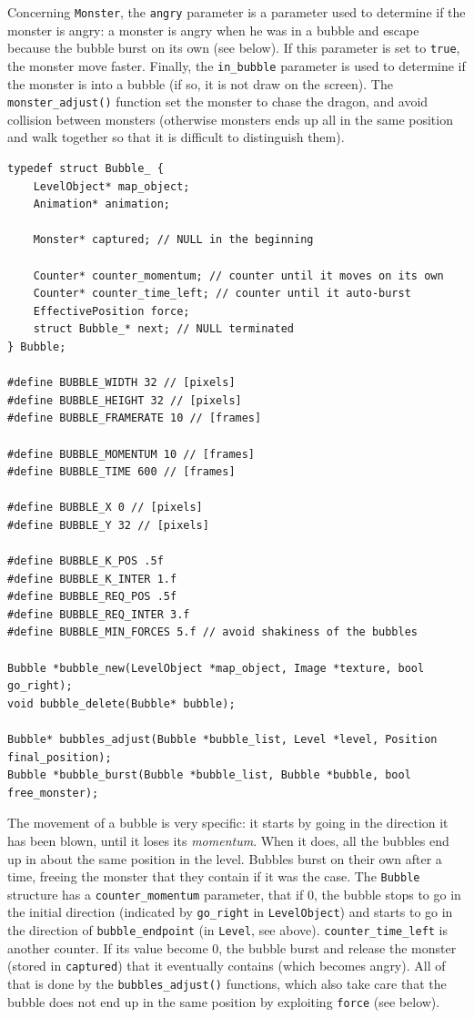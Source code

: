 \documentclass[12pt,a4paper]{article}
\newcommand{\cc}[1]{\texttt{#1}}
\begin{document}
Concerning \cc{Monster}, the \cc{angry} parameter is a parameter used to determine if the monster is angry: a monster is angry when he was in a bubble and escape because the bubble burst on its own (see below). If this parameter is set to \cc{true}, the monster move faster. Finally, the \cc{in_bubble} parameter is used to determine if the monster is into a bubble (if so, it is not draw on the screen). The \cc{monster_adjust()} function set the monster to chase the dragon, and avoid collision between monsters (otherwise monsters ends up all in the same position and walk together so that it is difficult to distinguish them).

\begin{verbatim}
typedef struct Bubble_ {
    LevelObject* map_object;
    Animation* animation;

    Monster* captured; // NULL in the beginning

    Counter* counter_momentum; // counter until it moves on its own
    Counter* counter_time_left; // counter until it auto-burst
    EffectivePosition force;
    struct Bubble_* next; // NULL terminated
} Bubble;

#define BUBBLE_WIDTH 32 // [pixels]
#define BUBBLE_HEIGHT 32 // [pixels]
#define BUBBLE_FRAMERATE 10 // [frames]

#define BUBBLE_MOMENTUM 10 // [frames]
#define BUBBLE_TIME 600 // [frames]

#define BUBBLE_X 0 // [pixels]
#define BUBBLE_Y 32 // [pixels]

#define BUBBLE_K_POS .5f
#define BUBBLE_K_INTER 1.f
#define BUBBLE_REQ_POS .5f
#define BUBBLE_REQ_INTER 3.f
#define BUBBLE_MIN_FORCES 5.f // avoid shakiness of the bubbles

Bubble *bubble_new(LevelObject *map_object, Image *texture, bool go_right);
void bubble_delete(Bubble* bubble);

Bubble* bubbles_adjust(Bubble *bubble_list, Level *level, Position final_position);
Bubble *bubble_burst(Bubble *bubble_list, Bubble *bubble, bool free_monster);
\end{verbatim}

The movement of a bubble is very specific: it starts by going in the direction it has been blown, until it loses its \textit{momentum}. When it does, all the bubbles end up in about the same position in the level. Bubbles burst on their own after a time, freeing the monster that they contain if it was the case. The \cc{Bubble} structure has a \cc{counter_momentum} parameter, that if 0, the bubble stops to go in the initial direction (indicated by \cc{go_right} in \cc{LevelObject}) and starts to go in the direction of \cc{bubble_endpoint} (in \cc{Level}, see above). \cc{counter_time_left} is another counter. If its value become 0, the bubble burst and release the monster (stored in \cc{captured}) that it eventually contains (which becomes angry). All of that is done by the \cc{bubbles_adjust()} functions, which also take care that the bubble does not end up in the same position by exploiting \cc{force} (see below).
\end{document}
